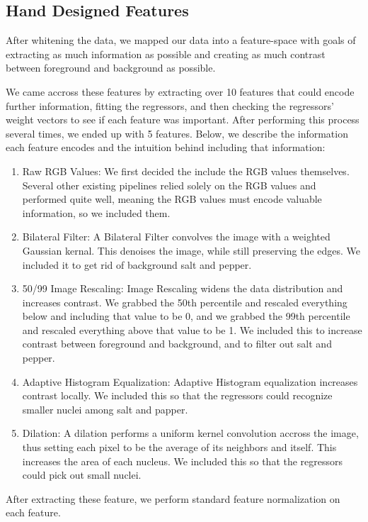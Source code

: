 \documentclass[paper=letter, fontsize=12pt]{article}
\numberwithin{equation}{section} %
\numberwithin{figure}{section} %
\numberwithin{table}{section} %
\begin{document}
\subsection{Hand Designed Features}

After whitening the data, we mapped our data into a feature-space with goals of
extracting as much information as possible and creating as much contrast between
foreground and background as possible.

We came accross these features by extracting over 10 features that could encode
further information, fitting the regressors, and then checking the regressors'
weight vectors to see if each feature was important. After performing this
process several times, we ended up with 5 features. Below, we describe the
information each feature encodes and the intuition behind including that information:

\begin{enumerate}
  \item Raw RGB Values:
  We first decided the include the RGB values themselves. Several other
  existing pipelines relied solely on the RGB values and performed quite well,
  meaning the RGB values must encode valuable information, so we included them.
  \item  Bilateral Filter:
  A Bilateral Filter convolves the image with a weighted Gaussian kernal. This
  denoises the image, while still preserving the edges. We included it to
  get rid of background salt and pepper.
  \item 50/99 Image Rescaling:
  Image Rescaling widens the data distribution and increases contrast. We grabbed
  the 50th percentile and rescaled everything below and including that value to
  be 0, and we grabbed the 99th percentile and rescaled everything above that
  value to be 1. We included this to increase contrast between foreground and background,
  and to filter out salt and pepper.
  \item Adaptive Histogram Equalization:
  Adaptive Histogram equalization increases contrast locally. We included this
  so that the regressors could recognize smaller nuclei among salt and papper.
  \item Dilation:
  A dilation performs a uniform kernel convolution accross the image, thus
  setting each pixel to be the average of its neighbors and itself. This increases
  the area of each nucleus. We included this so that the regressors could pick
  out small nuclei.

\end{enumerate}
After extracting these feature, we perform standard feature normalization on
each feature.
\end{document}
